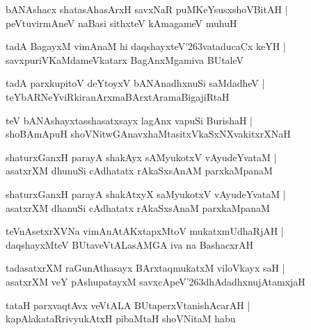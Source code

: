 \documentclass[twoside,12pt,openright]{book}
\def\S{\char'263}
\newcounter{shloka}[chapter]
\begin{document}
\begin{shloka}%
bANAshacx shatasAhasArxH savxNaR puMKeYsusxshoVBitAH |\\
peVtuvirmAneV naBasi sithxteV kAmagameV muhuH 
\end{shloka}

\begin{shloka}%
tadA BagayxM vimAnaM hi daqshayxteV\S vataducaCx keYH |\\
savxpuriVKaMdameVkatarx BagAnxMgamiva BUtaleV 
\end{shloka}

\begin{shloka}%
tadA parxkupitoV deYtoyxV bANAnadhxnuSi saMdadheV |\\
teYbARNeYviRkiranArxmaBArxtAramaBigajiRtaH 
\end{shloka}

\begin{shloka}%
teV bANAshayxtasshasatxsayx lagAnx vapuSi BurishaH |\\
shoBAmApuH shoVNitwGAnavxhaMtasitxVkaSxNXvakitxrXNaH 
\end{shloka}

\begin{shloka}%
shaturxGanxH parayA shakAyx sAMyukotxV vAyudeYvataM |\\
asatxrXM dhunuSi cAdhatatx rAkaSxsAnAM parxkaMpanaM 
\end{shloka}

\begin{shloka}%
shaturxGanxH parayA shakAtxyX saMyukotxV vAyudeYvataM |\\
asatxrXM dhanuSi cAdhatatx rAkaSxsAnaM parxkaMpanaM 
\end{shloka}

\begin{shloka}%
teVnAsetxrXVNa  vimAnAtAKxtapxMtoV mukatxmUdhaRjAH |\\
daqshayxMteV BUtaveVtALasAMGA iva na BashacxrAH
\end{shloka}

\begin{shloka}%
tadasatxrXM raGunAthasayx BArxtaqmukatxM viloVkayx saH |\\
asatxrXM veY pAshupatayxM savxcApeV\S dhAdadhxnujAtamxjaH 
\end{shloka}

\begin{shloka}%
tataH parxvaqtAvx veVtALA BUtaperxVtanishAcarAH |\\
kapAlakataRrivyukAtxH pibaMtaH shoVNitaM habu
\end{shloka}
\end{document}

